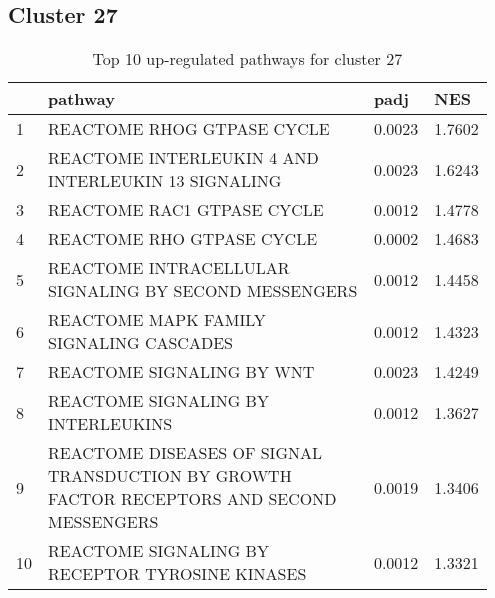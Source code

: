 \documentclass{article}
\begin{document}
\subsection{Cluster 27 }
\begin{table}[H]
\centering
\begin{tabular}{p{0.05\linewidth}p{0.7\linewidth}p{0.1\linewidth}p{0.1\linewidth}}
  \hline
 & pathway & padj & NES \\ 
  \hline
1 & REACTOME RHOG GTPASE CYCLE & 0.0023 & 1.7602 \\ 
  2 & REACTOME INTERLEUKIN 4 AND INTERLEUKIN 13 SIGNALING & 0.0023 & 1.6243 \\ 
  3 & REACTOME RAC1 GTPASE CYCLE & 0.0012 & 1.4778 \\ 
  4 & REACTOME RHO GTPASE CYCLE & 0.0002 & 1.4683 \\ 
  5 & REACTOME INTRACELLULAR SIGNALING BY SECOND MESSENGERS & 0.0012 & 1.4458 \\ 
  6 & REACTOME MAPK FAMILY SIGNALING CASCADES & 0.0012 & 1.4323 \\ 
  7 & REACTOME SIGNALING BY WNT & 0.0023 & 1.4249 \\ 
  8 & REACTOME SIGNALING BY INTERLEUKINS & 0.0012 & 1.3627 \\ 
  9 & REACTOME DISEASES OF SIGNAL TRANSDUCTION BY GROWTH FACTOR RECEPTORS AND SECOND MESSENGERS & 0.0019 & 1.3406 \\ 
  10 & REACTOME SIGNALING BY RECEPTOR TYROSINE KINASES & 0.0012 & 1.3321 \\ 
   \hline
\end{tabular}
\caption{Top 10 up-regulated pathways for cluster 27} 
\label{tab:q3_2_27}
\end{table}
\end{document}
